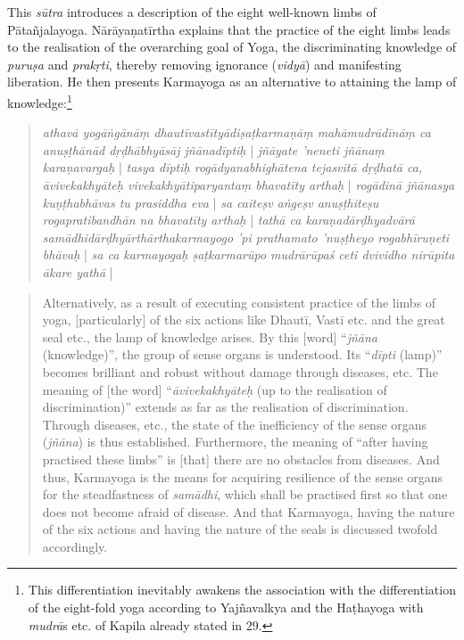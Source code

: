 This \textit{sūtra} introduces a description of the eight well-known limbs of Pātañjalayoga. Nārāyaṇatīrtha explains that the practice of the eight limbs leads to the realisation of the overarching goal of Yoga, the discriminating knowledge of \textit{puruṣa} and \textit{prakṛti}, thereby removing ignorance (\textit{vidyā}) and manifesting liberation. He then presents Karmayoga as an alternative to attaining the lamp of knowledge:\footnote{This differentiation inevitably awakens the association with the differentiation of the eight-fold yoga according to Yajñavalkya and the Haṭhayoga with \textit{mudrā}s etc. of Kapila already stated in  29.}
\begin{quote}
\textit{athavā yogāṅgānāṃ dhautīvastītyādiṣaṭkarmaṇāṃ mahāmudrādīnāṃ ca anuṣṭhānād dṛḍhābhyāsāj jñānadīptiḥ} | \textit{jñāyate 'neneti jñānaṃ karaṇavargaḥ} | \textit{tasya dīptiḥ rogādyanabhighātena tejasvitā dṛḍhatā ca, āvivekakhyāteḥ vivekakhyātiparyantaṃ bhavatīty arthaḥ} | \textit{rogādinā jñānasya kuṇṭhabhāvas tu prasiddha eva} | \textit{sa caiteṣv aṅgeṣv anuṣṭhiteṣu rogapratibandhān na bhavatīty arthaḥ} | \textit{tathā ca karaṇadārḍhyadvārā samādhidārḍhyārthārthakarmayogo 'pi prathamato 'nuṣṭheyo rogabhīruṇeti bhāvaḥ} | \textit{sa ca karmayogaḥ ṣaṭkarmarūpo mudrārūpaś ceti dvividho nirūpita ākare yathā} | 
\end{quote}
\begin{quote}
Alternatively, as a result of executing consistent practice of the limbs of yoga, [particularly] of the six actions like Dhautī, Vastī etc. and the great seal etc., the lamp of knowledge arises. By this [word] ``\textit{jñāna} (knowledge)'', the group of sense organs is understood. Its ``\textit{dīpti} (lamp)'' becomes brilliant and robust without damage through diseases, etc. The meaning of [the word] ``\textit{āvivekakhyāteḥ} (up to the realisation of discrimination)'' extends as far as the realisation of discrimination. Through diseases, etc., the state of the inefficiency of the sense organs (\textit{jñāna}) is thus established. Furthermore, the meaning of ``after having practised these limbs'' is [that] there are no obstacles from diseases. And thus, Karmayoga is the means for acquiring resilience of the sense organs for the steadfastness of \textit{samādhi}, which shall be practised first so that one does not become afraid of disease. And that Karmayoga, having the nature of the six actions and having the nature of the seals is discussed twofold accordingly.
\end{quote}

